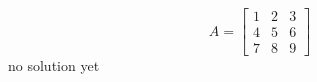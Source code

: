 {
\[A=
\begin{bmatrix}
	1 & 2 & 3 \\
	4 & 5 & 6 \\
	7 & 8 & 9
\end{bmatrix}
\]
}
{
no solution yet
}
